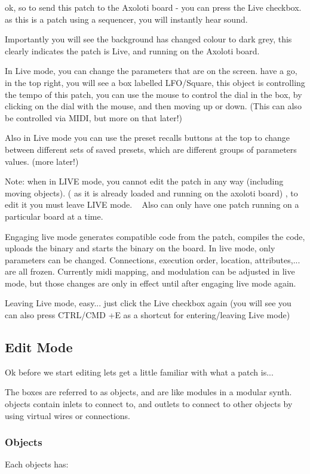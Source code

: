 ok, so to send this patch to the Axoloti board -\/ you can press the Live checkbox. as this is a patch using a sequencer, you will instantly hear sound.

Importantly you will see the background has changed colour to dark grey, this clearly indicates the patch is Live, and running on the Axoloti board.

In Live mode, you can change the parameters that are on the screen. have a go, in the top right, you will see a box labelled L\+F\+O/\+Square, this object is controlling the tempo of this patch, you can use the mouse to control the dial in the box, by clicking on the dial with the mouse, and then moving up or down. (This can also be controlled via M\+I\+DI, but more on that later!)

Also in Live mode you can use the preset recalls buttons at the top to change between different sets of saved presets, which are different groups of parameters values. (more later!)

Note\+: when in L\+I\+VE mode, you cannot edit the patch in any way (including moving objects). ( as it is already loaded and running on the axoloti board) , to edit it you must leave L\+I\+VE mode. ~\newline
 Also can only have one patch running on a particular board at a time.

Engaging live mode generates compatible code from the patch, compiles the code, uploads the binary and starts the binary on the board. In live mode, only parameters can be changed. Connections, execution order, location, attributes,... are all frozen. Currently midi mapping, and modulation can be adjusted in live mode, but those changes are only in effect until after engaging live mode again.

Leaving Live mode, easy... just click the Live checkbox again (you will see you can also press C\+T\+R\+L/\+C\+MD +E as a shortcut for entering/leaving Live mode)\hypertarget{axo_gui_axo_gui_axoloti_edit_mode}{}\subsection{Edit Mode}\label{axo_gui_axo_gui_axoloti_edit_mode}
Ok before we start editing lets get a little familiar with what a patch is...

The boxes are referred to as \textquotesingle{}objects\textquotesingle{}, and are like modules in a modular synth. objects contain inlets to connect to, and outlets to connect to other objects by using virtual wires or connections.\hypertarget{axo_gui_axo_gui_axoloti_edit_mode_objects}{}\subsubsection{Objects}\label{axo_gui_axo_gui_axoloti_edit_mode_objects}
Each objects has\+:


